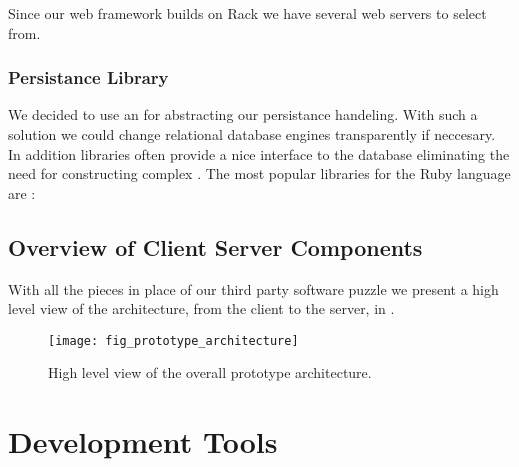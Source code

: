 Since our web framework builds on Rack we have several web servers to select
from.



\subsubsection{Persistance Library}

We decided to use an %
\sidenote{
}
for abstracting our persistance handeling. With such a solution we could
change relational database engines transparently if  neccesary. In addition
 libraries often provide a nice interface to the database
eliminating the need for constructing complex %
\sidenote{
}. The most popular  libraries for the Ruby language are%
:

\begin{items}
\end{items}

\subsection{Overview of Client \oldand Server Components}

With all the pieces in place of our third party software puzzle
we present a high level view of the architecture, from the client to the
server, in
.

\begin{figure}
  \begin{whole}
    \centering
    \texttt{[image: fig\_prototype\_architecture]}
    \caption[Prototype Architecture]{
      High level view of the overall prototype architecture.
    }
    \label{figure:fig.prototype.architecture}
  \end{whole}
\end{figure}


\section{Development Tools}

